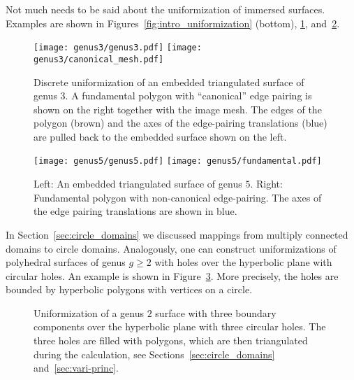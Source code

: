 \documentclass[Thesis]{subfiles}
\begin{document}
Not much needs to be said about the uniformization of immersed
surfaces. Examples are shown in Figures~\ref{fig:intro_uniformization}
(bottom), \ref{fig:embedded_genus_3}, and~\ref{fig:embedded_genus_5}.
\begin{figure}
\centering
\hspace*{\fill}\texttt{[image: genus3/genus3.pdf]}\hfill%
\texttt{[image: genus3/canonical\_mesh.pdf]}\hspace*{\fill}
\caption{Discrete uniformization of an embedded triangulated surface
  of genus $3$. A fundamental polygon with ``canonical'' edge pairing
  is shown on the right together with the image mesh. The edges of the
  polygon (brown) and the axes of the edge-pairing translations (blue)
  are pulled back to the embedded surface shown on the left.}
\label{fig:embedded_genus_3}
\end{figure}
\begin{figure}
\centering
\hspace*{\fill}\texttt{[image: genus5/genus5.pdf]}\hspace*{\fill}%
\texttt{[image: genus5/fundamental.pdf]}\hspace*{\fill}
\caption{Left: An embedded triangulated surface of genus $5$. Right:
  Fundamental polygon with non-canonical edge-pairing. The axes of the
  edge pairing translations are shown in blue.}
\label{fig:embedded_genus_5}
\end{figure}
In Section~\ref{sec:circle_domains} we discussed mappings from
multiply connected domains to circle domains. Analogously, one can
construct uniformizations of polyhedral surfaces of genus $g\geq 2$
with holes over the hyperbolic plane with circular holes. An example
is shown in Figure~\ref{fig:hyperbolic_circle_domain}. More precisely,
the holes are bounded by hyperbolic polygons with vertices on a
circle. 
\begin{figure}
\centering
{}
\caption{ Uniformization of a genus $2$ surface with three boundary
  components over the hyperbolic plane with three circular holes. The
  three holes are filled with polygons, which are then triangulated
  during the calculation, see Sections~\ref{sec:circle_domains}
  and~\ref{sec:vari-princ}.  }
\label{fig:hyperbolic_circle_domain}
\end{figure}
\end{document}
